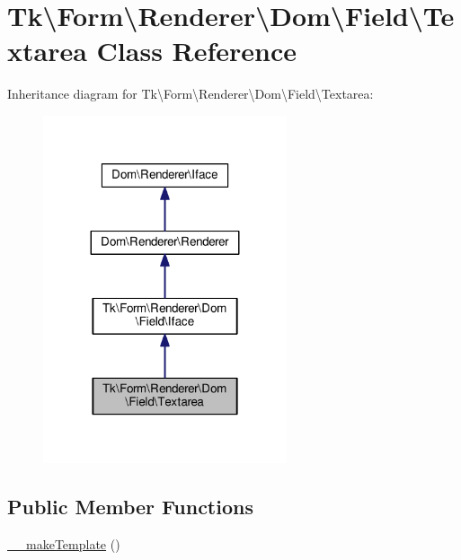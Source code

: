 \hypertarget{classTk_1_1Form_1_1Renderer_1_1Dom_1_1Field_1_1Textarea}{\section{Tk\textbackslash{}Form\textbackslash{}Renderer\textbackslash{}Dom\textbackslash{}Field\textbackslash{}Textarea Class Reference}
\label{classTk_1_1Form_1_1Renderer_1_1Dom_1_1Field_1_1Textarea}
}


Inheritance diagram for Tk\textbackslash{}Form\textbackslash{}Renderer\textbackslash{}Dom\textbackslash{}Field\textbackslash{}Textarea\+:\nopagebreak
\begin{figure}[H]
\begin{center}
\leavevmode
\includegraphics[width=203pt]{classTk_1_1Form_1_1Renderer_1_1Dom_1_1Field_1_1Textarea__inherit__graph}
\end{center}
\end{figure}
\subsection*{Public Member Functions}
\begin{DoxyCompactItemize}
\item 
\hyperlink{classTk_1_1Form_1_1Renderer_1_1Dom_1_1Field_1_1Textarea_a8ca600786dc683affae598990bd22a12}{\+\_\+\+\_\+make\+Template} ()
\end{DoxyCompactItemize}
